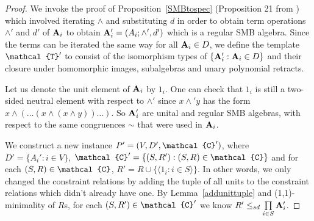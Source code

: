\documentclass[11pt]{amsart}
\newcommand{\m}[1]{{\uppercase {\mathbf {#1}}}}
\newcommand{\vr}[1]{{\uppercase {\mathcal{#1}}}}
\newcommand{\lb}{\langle}
\newcommand{\rb}{\rangle}
\newcommand{\mt}{\wedge}
\theoremstyle{definition}
\begin{document}
\begin{proof}
We invoke the proof of Proposition~\ref{SMBtospec} (Proposition 21 from \cite{SMB1}) which involved iterating $\mt$ and substituting $d$ in order to obtain term operations $\mt'$ and $d'$ of $\m a_i$ to obtain $\m a_i'=(A_i;\mt',d')$ which is a regular SMB algebra. Since the terms can be iterated the same way for all $\m a_i\in D$, we define the template $\vr t'$ to consist of the isomorphism types of $\{\m a_i':\m a_i\in D\}$ and their closure under homomorphic images, subalgebras and unary polynomial retracts.

Let us denote the unit element of $\m a_i$ by $1_i$. One can check that $1_i$ is still a two-sided neutral element with respect to $\mt '$ since $x\mt'y$ has the form $x\mt(\dots(x\mt (x\mt y))\dots)$. So $\m a_i'$ are unital and regular SMB algebras, with respect to the same congruences $\sim$ that were used in $\m a_i$.

We construct a new instance $P'=(V,D',\vr c')$, where $D'=\{A_i':i\in V\}$, $\vr c'=\{(S,R'):(S,R)\in \vr c\}$ and for each $(S,R)\in \vr c$, $R'=R\cup\{\lb 1_i:i\in S\rb\}$. In other words, we only changed the constraint relations by adding the tuple of all units to the constraint relations which didn't already have one. By Lemma~\ref{addunittuple} and (1,1)-minimality of $R$s, for each $(S,R')\in \vr c'$ we know $R'\leq_{sd}\prod\limits_{i\in S}\m a_i'$.


\end{proof}
\end{document}
